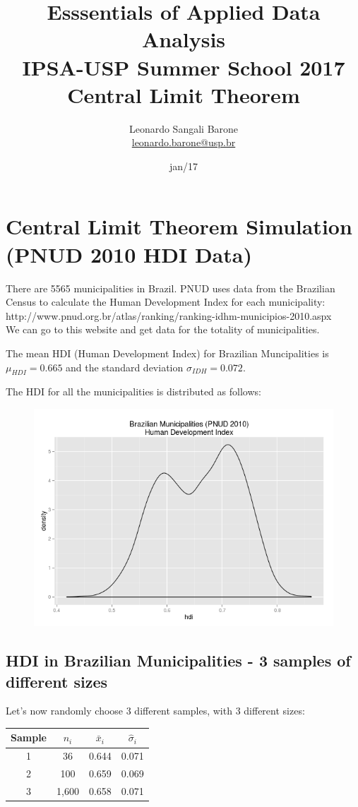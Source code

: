 \documentclass[11pt]{article}
\title{\textbf{Esssentials of Applied Data Analysis\\
				IPSA-USP Summer School 2017}\newline\\
				Central Limit Theorem}
\author{Leonardo Sangali Barone\\ \href{leonardo.barone@usp.br}{leonardo.barone@usp.br}}
\date{jan/17}
\begin{document}
\maketitle

\section*{Central Limit Theorem Simulation (PNUD 2010 HDI Data)}

There are 5565 municipalities in Brazil. PNUD uses data from the Brazilian Census to calculate the Human Development Index for each municipality:
\newline\\http://www.pnud.org.br/atlas/ranking/ranking-idhm-municipios-2010.aspx\newline\\
We can go to this website and get data for the totality of municipalities.

The mean HDI (Human Development Index) for Brazilian Muncipalities is $\mu_{HDI}=0.665$ and the standard deviation $\sigma_{IDH} = 0.072$.

	The HDI for all the municipalities is distributed as follows:

\begin{figure}[htp]
\centering
\includegraphics[scale=0.50]{clt_pop_dist.png}
\caption{}
\label{}
\end{figure}

\subsection*{HDI in Brazilian Municipalities - 3 samples of different sizes}
	Let's now randomly choose 3 different samples, with 3 different sizes:
\newline\\
\begin{tabular}{|c|c|c|c|}
\hline
	Sample & $n_i$ & $\bar{x}_i$ & $\hat{\sigma}_i$\\
\hline
	1 & 36 & 0.644 & 0.071\\
	2 & 100 & 0.659 & 0.069\\
	3 & 1,600 & 0.658 & 0.071\\
\hline
\end{tabular}
\end{document}
